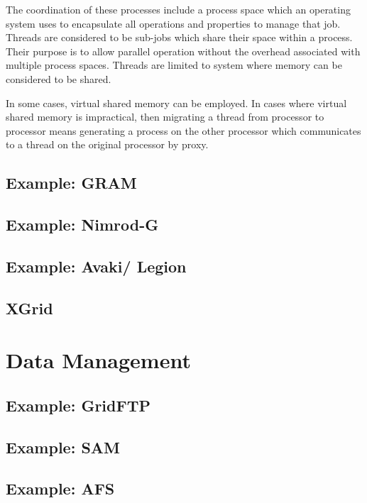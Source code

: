 \documentclass[11pt]{article}
\begin{document}
 The coordination of these processes include a process space which an operating system uses to encapsulate all operations and properties to manage that job.  Threads are considered to be sub-jobs which share their space within a process.  Their purpose is to allow parallel operation without the overhead associated with multiple process spaces.  Threads are limited to system where memory can be considered to be shared.  
 
 In some cases, virtual shared memory can be employed.  In cases where virtual shared memory is impractical, then migrating a thread from processor to processor means generating a process on the other processor which communicates to a thread on the original processor by proxy.  
 
 \subsection{Example: GRAM}
 
 \subsection {Example: Nimrod-G}
 
 \subsection {Example: Avaki/ Legion}
 
 \subsection {XGrid}
 
 \section {Data Management}
 
 \subsection {Example: GridFTP}
 
 \subsection {Example: SAM}
 
 \subsection {Example: AFS}
 
\end{document}
